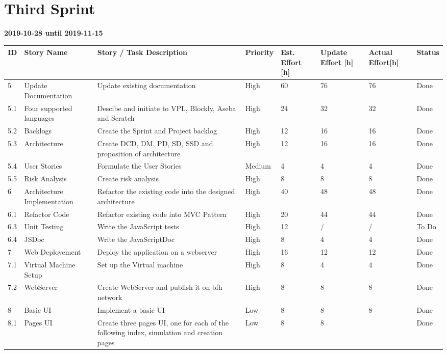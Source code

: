 \documentclass{scrbook}
\begin{document}
\section{Third Sprint}
\textbf{2019-10-28 until 2019-11-15}
\begin{longtable}{p{5mm}|p{2cm}|p{4cm}|p{1cm}|p{1cm}|p{1cm}|p{1cm}|p{15mm}}
  ID                     & Story Name & Story / Task Description & Priority & Est. Effort {[}h{]} & Update Effort {[}h{]} & Actual Effort{[}h{]} & Status                \\ \hline
  5 & Update Documentation & Update existing documentation & High & 60 & 76 & 76 & Done \\
  5.1 & Four supported languages & Descibe and initiate to VPL, Blockly, Aseba and Scratch & High & 24 & 32 & 32 & Done \\ 
  5.2 & Backlogs & Create the Sprint and Project backlog & High & 12 & 16 & 16 & Done \\ 
  5.3 & Architecture & Create DCD, DM, PD, SD, SSD and proposition of architecture & High & 12 & 16 & 16 & Done \\
  5.4 & User Stories & Formulate the User Stories & Medium & 4 & 4 & 4 & Done \\ 
  5.5 & Risk Analysis & Create risk analysis & High & 8 & 8 & 8 & Done \\ 
  6 & Architecture Implementation & Refactor the existing code into the designed architecture & High & 40 & 48 & 48 & Done \\ 
  6.1 & Refactor Code & Refactor existing code into MVC Pattern & High & 20 & 44 & 44 & Done \\ 
  6.3 & Unit Testing & Write the JavaScript tests & High & 12 & {/} & {/} & To Do \\
  6.4 & JSDoc & Write the JavaScriptDoc & High & 8 & 4 & 4 & Done \\ 
  7 & Web Deployement & Deploy the application on a webserver & High & 16 & 12 & 12 & Done \\ 
  7.1 & Virtual Machine Setup & Set up the Virtual machine & High & 8 & 4 & 4 & Done \\ 
  7.2 & WebServer & Create WebServer and publish it on bfh network & High & 8 & 8 & 8 & Done \\
  8 & Basic UI & Implement a basic UI & Low & 8 & 8 & 8 & Done \\ 
  8.1 & Pages UI & Create three pages UI, one for each of the following index, simulation and creation pages & Low & 8 & 8 &  & Done \\
\end{longtable}
\end{document}

